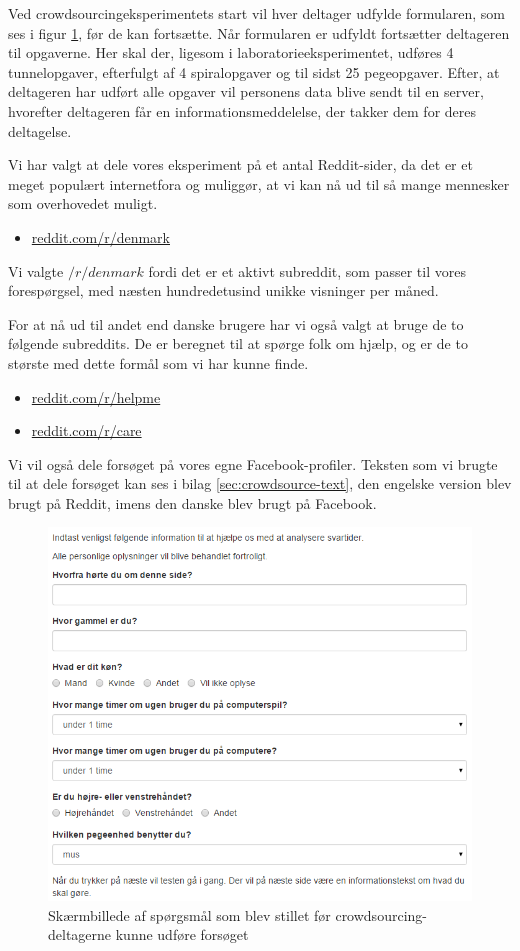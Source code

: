 Ved crowdsourcingeksperimentets start vil hver deltager udfylde formularen, som ses i figur \ref{fig:Questions}, før de kan fortsætte. Når formularen er udfyldt fortsætter deltageren til opgaverne. Her skal der, ligesom i laboratorieeksperimentet, udføres 4 tunnelopgaver, efterfulgt af 4 spiralopgaver og til sidst 25 pegeopgaver. Efter, at deltageren har udført alle opgaver vil personens data blive sendt til en server, hvorefter deltageren får en informationsmeddelelse, der takker dem for deres deltagelse.

Vi har valgt at dele vores eksperiment på et antal Reddit-sider, da det er et meget populært internetfora og muliggør, at vi kan nå ud til så mange mennesker som overhovedet muligt.
\begin{itemize}
\item \url{reddit.com/r/denmark}
\end{itemize}
Vi valgte $/r/denmark$ fordi det er et aktivt subreddit, som passer til vores forespørgsel, med næsten hundredetusind unikke visninger per måned. 

For at nå ud til andet end danske brugere har vi også valgt at bruge de to følgende subreddits. De er beregnet til at spørge folk om hjælp, og er de to største med dette formål som vi har kunne finde.
\begin{itemize}
\item \url{reddit.com/r/helpme}
\item \url{reddit.com/r/care}
\end{itemize}

Vi vil også dele forsøget på vores egne Facebook-profiler. Teksten som vi brugte til at dele forsøget kan ses i bilag \ref{sec:crowdsource-text}, den engelske version blev brugt på Reddit, imens den danske blev brugt på Facebook.
\begin{figure}[h]
\centering
\includegraphics[width=.5\linewidth, trim = 0cm 0cm 7cm 0cm, clip]{images/screenshots/ex_questions}
\caption{Skærmbillede af spørgsmål som blev stillet før crowdsourcing-deltagerne kunne udføre forsøget}
\label{fig:Questions}
\end{figure}

